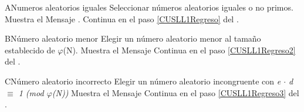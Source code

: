 
		
\begin{UCtrayectoriaA}{A}{Numeros aleatorios iguales}
	\UCpaso Seleccionar números aleatorios iguales o no primos.
	\UCpaso Muestra el Mensaje .
	\UCpaso Continua en el paso \ref{CUSLL1Regreso} del .
\end{UCtrayectoriaA}

\begin{UCtrayectoriaA}{B}{Número aleatorio menor}
	\UCpaso Elegir un número aleatorio menor al tamaño establecido de $\varphi$(N).
	\UCpaso Muestra el Mensaje 
	\UCpaso Continua en el paso \ref{CUSLL1Regreso2} del .
\end{UCtrayectoriaA}

\begin{UCtrayectoriaA}{C}{Número aleatorio incorrecto}
	\UCpaso Elegir un número aleatorio incongruente con \textit{e $\cdot$ d $\equiv$ 1 (mod $\varphi$(N))} 
	\UCpaso Muestra el Mensaje 
	\UCpaso Continua en el paso \ref{CUSLL1Regreso3} del .
\end{UCtrayectoriaA}

